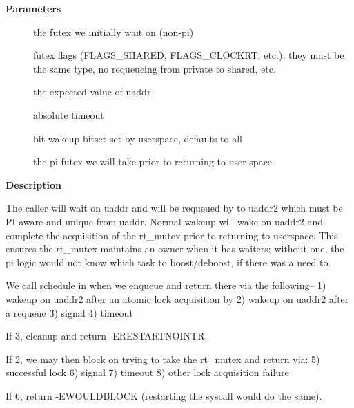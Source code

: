 \documentclass[a4paper,8pt,english]{sphinxmanual}
\begin{document}
\textbf{Parameters}
\begin{description}
\item[{}] \leavevmode
the futex we initially wait on (non-pi)

\item[{}] \leavevmode
futex flags (FLAGS\_SHARED, FLAGS\_CLOCKRT, etc.), they must be
the same type, no requeueing from private to shared, etc.

\item[{}] \leavevmode
the expected value of uaddr

\item[{}] \leavevmode
absolute timeout

\item[{}]  bit wakeup bitset set by userspace, defaults to all

\item[{}] \leavevmode
the pi futex we will take prior to returning to user-space

\end{description}

\textbf{Description}

The caller will wait on uaddr and will be requeued by {\hyperref[kernel\string-hacking/locking:c.futex_requeue]{\emph{}}} to
uaddr2 which must be PI aware and unique from uaddr.  Normal wakeup will wake
on uaddr2 and complete the acquisition of the rt\_mutex prior to returning to
userspace.  This ensures the rt\_mutex maintains an owner when it has waiters;
without one, the pi logic would not know which task to boost/deboost, if
there was a need to.

We call schedule in {\hyperref[kernel\string-hacking/locking:c.futex_wait_queue_me]{\emph{}}} when we enqueue and return there
via the following--
1) wakeup on uaddr2 after an atomic lock acquisition by {\hyperref[kernel\string-hacking/locking:c.futex_requeue]{\emph{}}}
2) wakeup on uaddr2 after a requeue
3) signal
4) timeout

If 3, cleanup and return -ERESTARTNOINTR.

If 2, we may then block on trying to take the rt\_mutex and return via:
5) successful lock
6) signal
7) timeout
8) other lock acquisition failure

If 6, return -EWOULDBLOCK (restarting the syscall would do the same).
\end{document}

